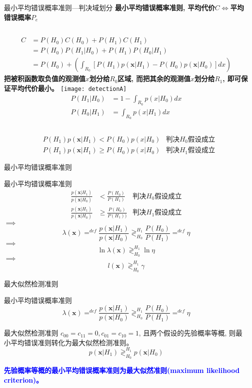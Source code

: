\begin{frame}[shrink]{最小平均错误概率准则---判决域划分}
\textbf{最小平均错误概率准则, 平均代价$C$}$\Leftrightarrow$\textbf{平均错误概率$P_e$}
\begin{columns}
	\small
	\begin{align*}
	C&=P(H_0)C(H_0)+P(H_1)C(H_1)\\
	&=P(H_0)P(H_1|H_0)+P(H_1)P(H_0|H_1)\\
	&=P(H_0)+\left(\int_{R_0}\left[P({H_1})p(\bm{x}|H_1)-P(H_0)p(\bm{x}|H_0)\right]dx \right)
	\end{align*}
    \scriptsize
	\textbf{把被积函数取负值的观测值$x$划分给$R_0$区域, 而把其余的观测值$x$划分给$R_1$, 即可保证平均代价最小。}
	\centering
	\texttt{[image: detectionA]}
	\scriptsize
	\begin{align*}
	P(H_1|H_0)&=1-\int_{R_0}p(x|H_0)dx\\ 
	P(H_0|H_1)&=\int_{R_0}p(x|H_1)dx
	\end{align*}
\end{columns}
\begin{align*}
&P({H_1})p(\bm{x}|H_1)< P(H_0)p(x|H_0)&\textbf{判决$H_0$假设成立}\\
&P({H_1})p(\bm{x}|H_1)\ge P(H_0)p(x|H_0)&\textbf{判决$H_1$假设成立}
\end{align*}
\end{frame}

\begin{frame}{最小平均错误概率准则}
\begin{block}{最小平均错误概率准则}
	\begin{align*}
	\frac{p(\bm{x}|H_1)}{p(\bm{x}|H_0)}&<\frac{P(H_0)}{P(H_1)}&\textbf{判决$H_0$假设成立}\\
	\frac{p(\bm{x}|H_1)}{p(\bm{x}|H_0)}&\ge\frac{P(H_0)}{P(H_1))}&\textbf{判决$H_1$假设成立}
	\end{align*}
	$\implies$
	\[ \lambda(\bm{x})\mathop{=}^{def}\frac{p(\bm{x}|H_1)}{p(\bm{x}|H_0)}\mathop{\gtrless}_{H_0}^{H_1}\frac{P(H_0)}{P(H_1)}\mathop{=}^{def}\eta \]
	$\implies$
	\[\ln\lambda(\bm{x})\mathop{\gtrless}_{H_0}^{H_1}\ln\eta \]
	$\implies$
	\[l(\bm{x})\mathop{\gtrless}_{H_0}^{H_1}\gamma \]
\end{block}
\end{frame}

\begin{frame}{最大似然检测准则}
\begin{block}{最小平均错误概率准则}
	\[ \lambda(\bm{x})\mathop{=}^{def}\frac{p(\bm{x}|H_1)}{p(\bm{x}|H_0)}\mathop{\gtrless}_{H_0}^{H_1}\frac{P(H_0)}{P(H_1)}\mathop{=}^{def}\eta \]
\end{block}
\begin{block}{最大似然检测准则}
	$c_{00}=c_{11}=0, c_{01}=c_{10}=1$, 且两个假设的先验概率等概, 则最小平均错误准则转化为最大似然检测准则。
	\[ p(\bm{x}|H_1)\mathop{\gtrless}_{H_0}^{H_1}p(\bm{x}|H_0) \]
\end{block}
\textbf{\textcolor{blue}{先验概率等概的最小平均错误概率准则为最大似然准则(maximum likelihood criterion)。}}
\end{frame}

